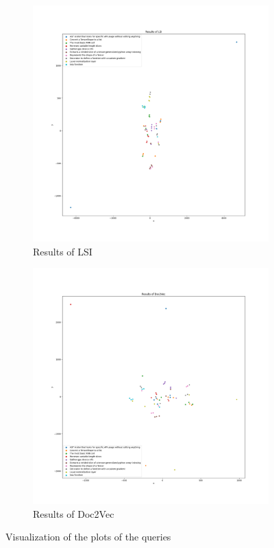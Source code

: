 \documentclass [14 pt]{article}
\begin{document}
\begin{figure}[h]
\centering
\begin{subfigure}[t]{0.45\textwidth}
\centering
\includegraphics[width=\textwidth]{../res/lsi.png}
\caption{Results of LSI}\label{fig:lsi}
\end{subfigure}
\hfil
\begin{subfigure}[t]{0.45\textwidth}
\centering
\includegraphics[width=\textwidth]{../res/doc2vec.png}
\caption{Results of Doc2Vec}\label{fig:doc2vec}
\end{subfigure}
\caption{Visualization of the plots of the queries}
\label{fig:plots}
\end{figure}
\end{document}
